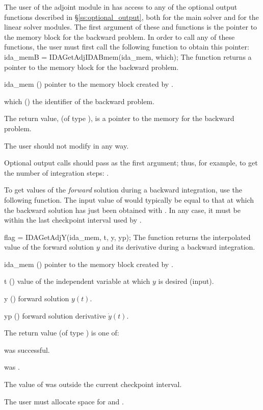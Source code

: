 The user of the adjoint module in {\idas} has access to any of the
optional output functions described in \S\ref{ss:optional_output},
both for the main solver and for the linear solver modules. The first
argument of these  and  functions is the
pointer to the {\idas} memory block for the backward problem. In order
to call any of these functions, the user must first call the following
function to obtain this pointer:
{
  ida\_memB = IDAGetAdjIDABmem(ida\_mem, which);
}
{
  The function  returns a pointer to the {\idas}
  memory block for the backward problem.
}
{
  \begin{args}
  \item[ida\_mem] ()
    pointer to the {\idas} memory block created by .
  \item[which] ()
    the identifier of the backward problem.
  \end{args}
}
{
  The return value,  (of type ), is a pointer to the
  {\idas} memory for the backward problem.
}
{
  {\warn}The user should not modify  in any way.

  Optional output calls should pass  as the first argument;
  thus, for example, to get the number of integration steps:
  .
}


To get values of the {\it forward} solution during a backward integration,
use the following function.  The input value of  would typically be
equal to that at which the backward solution has just been obtained with
.  In any case, it must be within the last checkpoint interval
used by .

{
  flag = IDAGetAdjY(ida\_mem, t, y, yp);
}
{
  The function  returns the interpolated value of the
 forward solution $y$ and its derivative during a backward integration.
}
{
  \begin{args}
  \item[ida\_mem] ()
    pointer to the {\idas} memory block created by .
  \item[t] ()
    value of the independent variable at which $y$ is desired (input).
  \item[y] () forward solution $y(t)$.
  \item[yp] () forward solution derivative $\dot{y}(t)$.
  \end{args}
}
{
  The return value  (of type ) is one of:
 \begin{args}
  \item[\Id{IDA\_SUCCESS}] 
     was successful. 
  \item[\Id{IDA\_MEM\_NULL}]
     was .
  \item[\Id{IDA\_GETY\_BADT}]
    The value of  was outside the current checkpoint interval.
  \end{args}
}
{
  {\warn} The user must allocate space for  and .
}

